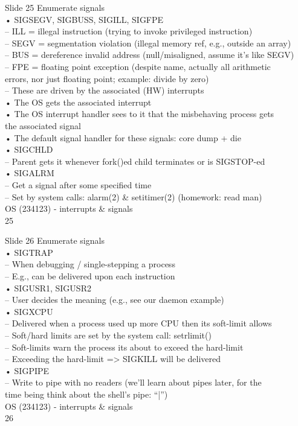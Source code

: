 \documentclass{beamer}
\begin{document}
\begin{frame}{Slide 25}
Enumerate signals\\• SIGSEGV, SIGBUSS, SIGILL, SIGFPE\\– ILL = illegal instruction (trying to invoke privileged instruction)\\– SEGV = segmentation violation (illegal memory ref, e.g., outside an array) \\– BUS = dereference invalid address (null/misaligned, assume it’s like SEGV)\\– FPE = floating point exception (despite name, actually all arithmetic \\errors, nor just floating point; example: divide by zero)\\– These are driven by the associated (HW) interrupts\\• The OS gets the associated interrupt\\• The OS interrupt handler sees to it that the misbehaving process gets \\the associated signal\\• The default signal handler for these signals: core dump + die\\• SIGCHLD\\– Parent gets it whenever fork()ed child terminates or is SIGSTOP-ed\\• SIGALRM\\– Get a signal after some specified time\\– Set by system calls: alarm(2) \& setitimer(2) (homework: read man)\\OS (234123) - interrupts \& signals\\25
\end{frame}
\begin{frame}{Slide 26}
Enumerate signals\\• SIGTRAP\\– When debugging / single-stepping a process\\– E.g., can be delivered upon each instruction\\• SIGUSR1, SIGUSR2\\– User decides the meaning (e.g., see our daemon example)\\• SIGXCPU\\– Delivered when a process used up more CPU then its soft-limit allows\\– Soft/hard limits are set by the system call: setrlimit()\\– Soft-limits warn the process its about to exceed the hard-limit\\– Exceeding the hard-limit => SIGKILL will be delivered\\• SIGPIPE\\– Write to pipe with no readers (we’ll learn about pipes later, for the \\time being think about the shell’s pipe: “|”)\\OS (234123) - interrupts \& signals\\26
\end{frame}
\end{document}
